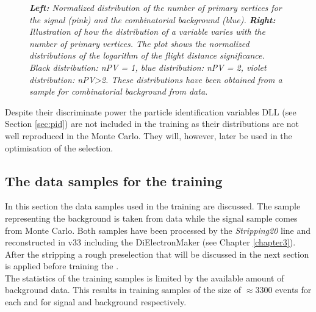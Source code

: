 \begin{figure}[!h]
\vspace*{-0.5cm}
\begin{center}
\end{center}
\vspace*{-0.8cm}
\caption{\textit{\textbf{Left:} Normalized distribution of the number of primary vertices for the signal (pink) and the combinatorial background (blue). \textbf{Right:} Illustration of how the distribution of a variable varies with the number of primary vertices. The plot shows the normalized distributions of the logarithm of the \Kstarz flight distance significance. Black distribution: nPV = 1, blue distribution: nPV = 2, violet distribution: nPV>2. These distributions have been obtained from a sample for combinatorial background from \lhcb data.}}
\label{fig:npvvariation}
\end{figure}
Despite their discriminate power the particle identification variables $\mathrm{DLL}$ (see Section \ref{sec:pid}) are not included in the training as their distributions are not well reproduced in the Monte Carlo. They will, however, later be used in the optimisation of the selection.\\

\subsection{The data samples for the \bdtn training}
In this section the data samples used in the \bdtn training are discussed. The sample representing the background is taken from \lhcb data while the signal sample comes from \BdKstee Monte Carlo. Both samples have been processed by the \BdKstee \textit{Stripping20} line and reconstructed in \davinci v33 including the DiElectronMaker (see Chapter \ref{chapter3}). After the stripping a rough preselection that will be discussed in the next section is applied before training the \bdtn.\\
The statistics of the training samples is limited by the available amount of background \lhcb data. This results in training samples of the size of $\approx$3300 events for each \bdtn and for signal and background respectively.\\

